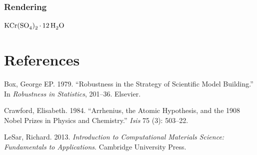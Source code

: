 \documentclass{book}
\newlength{\cslhangindent}
\newlength{\cslentryspacingunit} %
\newenvironment{CSLReferences}[2] %
 {%
  \setlength{\parindent}{0pt}
  \ifodd #1
  \let\oldpar\par
  \def\par{\hangindent=\cslhangindent\oldpar}
  \fi
  \setlength{\parskip}{#2\cslentryspacingunit}
 }%
 {}
\newenvironment{Shaded}{}{}
\newcommand{\SpecialCharTok}[1]{\textcolor[rgb]{0.25,0.44,0.63}{#1}}
\newcommand{\SpecialStringTok}[1]{\textcolor[rgb]{0.73,0.40,0.53}{#1}}
\begin{document}
\begin{Shaded}
\end{Shaded}

\hypertarget{rendering-2}{%
\subsection{Rendering}\label{rendering-2}}

\(\ce{KCr(SO4)2.12H2O}\)

\hypertarget{bibliography}{%
\chapter*{References}\label{bibliography}}

\hypertarget{refs}{}
\begin{CSLReferences}{1}{0}
\leavevmode{}%
Box, George EP. 1979. {``Robustness in the Strategy of Scientific Model
Building.''} In \emph{Robustness in Statistics}, 201--36. Elsevier.

\leavevmode{}%
Crawford, Elisabeth. 1984. {``Arrhenius, the Atomic Hypothesis, and the 1908
Nobel Prizes in Physics and Chemistry.''} \emph{Isis} 75 (3): 503--22.

\leavevmode{}%
LeSar, Richard. 2013. \emph{Introduction to Computational Materials Science:
Fundamentals to Applications}. Cambridge University Press.

\end{CSLReferences}

\backmatter
\end{document}

